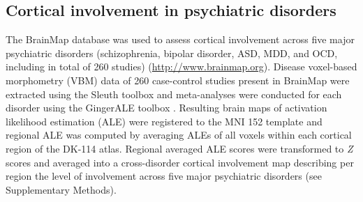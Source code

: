 \begin{refsection}
\subsection*{Cortical involvement in psychiatric disorders}
The BrainMap database was used to assess cortical involvement across five major psychiatric disorders (schizophrenia, bipolar disorder, ASD, MDD, and OCD, including in total of 260 studies) (\url{http://www.brainmap.org}). Disease voxel-based morphometry (VBM) data of 260 case-control studies present in BrainMap were extracted using the Sleuth toolbox \citep{Fox2002MappingCA} and meta-analyses were conducted for each disorder using the GingerALE toolbox \citep{Eickhoff2009CoordinatebasedAL}. Resulting brain maps of activation likelihood estimation (ALE) were registered to the MNI 152 template and regional ALE was computed by averaging ALEs of all voxels within each cortical region of the DK-114 atlas. Regional averaged ALE scores were transformed to \textit{Z} scores and averaged into a cross-disorder cortical involvement map describing per region the level of involvement across five major psychiatric disorders (see Supplementary Methods).


\end{refsection}
